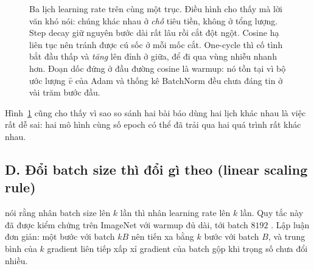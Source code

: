 \documentclass[../../../deep_learning.tex]{subfiles}
\begin{document}
\begin{figure}[H]\centering
{}
\caption{Ba lịch learning rate trên cùng một trục. Điều hình cho thấy mà lời văn khó nói: chúng khác nhau ở \emph{chỗ} tiêu tiền, không ở tổng lượng. Step decay giữ nguyên bước dài rất lâu rồi cắt đột ngột. Cosine hạ liên tục nên tránh được cú sốc ở mỗi mốc cắt. One-cycle thì cố tình bắt đầu thấp và \emph{tăng} lên đỉnh ở giữa, để đi qua vùng nhiễu nhanh hơn. Đoạn dốc đứng ở đầu đường cosine là warmup: nó tồn tại vì bộ ước lượng \(\hat v\) của Adam và thống kê BatchNorm đều chưa đáng tin ở vài trăm bước đầu.}
\label{fig:lich-learning-rate}
\end{figure}

Hình~\ref{fig:lich-learning-rate} cũng cho thấy vì sao so sánh hai bài báo dùng hai lịch khác nhau là việc rất dễ sai: hai mô hình cùng số epoch có thể đã trải qua hai quá trình rất khác nhau.



\subsection{D. Đổi batch size thì đổi gì theo (linear scaling rule)}
 nói rằng nhân batch size lên \(k\) lần thì nhân learning rate lên \(k\) lần. Quy tắc này đã được kiểm chứng trên ImageNet với warmup đủ dài, tới batch \(8192\) \cite{goyal2017accurate}. Lập luận đơn giản: một bước với batch \(kB\) nên tiến xa bằng \(k\) bước với batch \(B\), và trung bình của \(k\) gradient liên tiếp xấp xỉ gradient của batch gộp khi trọng số chưa đổi nhiều.
\end{document}
